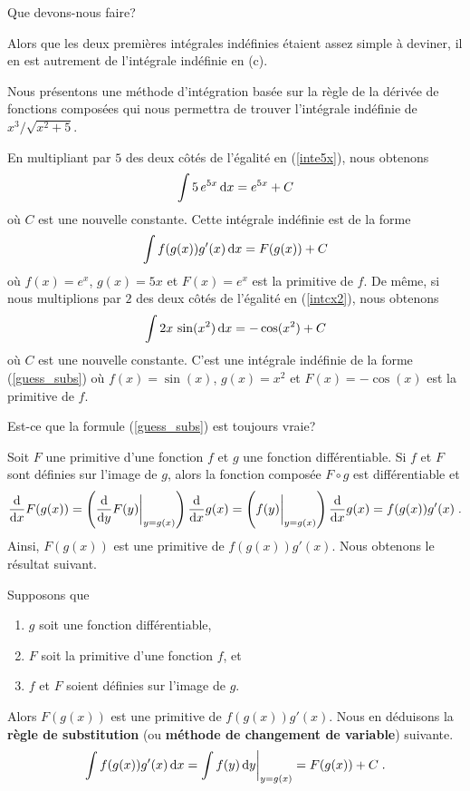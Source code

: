 {\begin{egg}
 Que devons-nous faire?
\end{egg}

Alors que les deux premières intégrales indéfinies étaient assez
simple à deviner, il en est autrement de l'intégrale indéfinie en
(c).

Nous présentons une méthode d'intégration basée sur la règle de la
dérivée de fonctions composées qui nous permettra de trouver
l'intégrale indéfinie de $x^3/\sqrt{x^2+5}$.

En multipliant par $5$ des deux côtés de l'égalité en (\ref{inte5x}),
nous obtenons
\[
\int 5\,e^{5x}  \dx{x} = e^{5x} + C
\]
où $C$ est une nouvelle constante.  Cette intégrale indéfinie est de
la forme
\begin{equation}\label{guess_subs}
\int f(g(x)) g'(x)  \dx{x} = F(g(x)) + C
\end{equation}
où $f(x)=e^x$, $g(x)=5x$ et $F(x)=e^x$ est la primitive de $f$.
De même, si nous multiplions par $2$ des deux côtés de l'égalité en
(\ref{intcx2}), nous obtenons
\[
\int 2x\,\sin(x^2)  \dx{x} = -\cos(x^2) + C
\]
où $C$ est une nouvelle constante.  C'est une intégrale indéfinie de
la forme (\ref{guess_subs}) où $f(x)=\sin(x)$, $g(x)=x^2$ et
$F(x) = -\cos(x)$ est la primitive de $f$.

Est-ce que la formule (\ref{guess_subs}) est toujours vraie?

Soit $F$ une primitive d'une fonction $f$ et $g$ une fonction
différentiable.  Si $f$ et $F$ sont définies sur l'image de $g$, alors
la fonction composée $F\circ g$ est différentiable et
\[
\dfdx{F(g(x))}{x} = \left(\dfdx{F(y)}{y}\bigg|_{y=g(x)}\right) \dfdx{g(x)}{x}
= \left( f(y) \bigg|_{y=g(x)}\right) \dfdx{g(x)}{x} = f(g(x)) g'(x) \; .
\]
Ainsi, $F(g(x))$ est une primitive de $f(g(x))g'(x)$.  Nous obtenons le
résultat suivant.

\begin{theorem} 
Supposons que
\begin{enumerate}
\item $g$ soit une fonction différentiable,
\item $F$ soit la primitive d'une fonction $f$, et
\item $f$ et $F$ soient définies sur l'image de $g$.
\end{enumerate}
Alors $F(g(x))$ est une primitive de $f(g(x))g'(x)$.  Nous en déduisons la
{\bfseries règle de substitution}
(ou {\bfseries méthode de changement de variable}) suivante.
\[
\int f(g(x))g'(x)  \dx{x} = \int f(y) \dx{y} \bigg|_{y=g(x)} =
F(g(x)) + C \; .
\]
\end{theorem}

}
